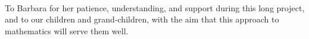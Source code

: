 
\maketitle


\ \vfil
\begin{center}
\parbox{24em}{To Barbara for her patience, understanding, and support during this long project, and to our children and grand-children, with the aim that this approach to mathematics will serve them well.}
\end{center}


\begin{comment}
\addtocounter{page}{-1}
In this draft, the blue text comments such as this are notes to developers about related references, about reasons for decisions, about more exercises, about possible future extensions, and so on.
Such comments are not intended for the published version, they are only notes for myself and developers.


Outstanding tasks for a first version include:
\begin{itemize}
\item finalising the scope of the book and of applications;
\item exercises on computing that do not require a computer, e.g., interpretation;
\item potentially more applications that involve `real' data, especially in Chapter~5 on approximating matrices;
\item adapt information, especially some uses of the SVD, from the book by Mark Holmes (2016) ``Introduction to scientific computing and data analysis'' Springer;
\item possibly concept maps;
\item short videos of procedures, examples, proofs.
\end{itemize}

The following page is a test of how much one page of information of OUP's style corresponds to my typesetting here, from \emph{p.10 of 2.1 Monograph Design Royal 600wpp normal SAMPLE}. 
In 10pt this line length is a little shorter, but the page length is a little bigger.  Now adjusted textheight so nearly the same amount of info per page when in 10pt.


\end{comment}
